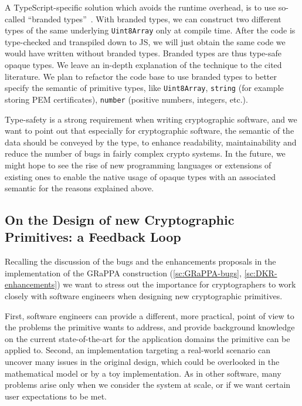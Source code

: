 A TypeScript-specific solution which avoids the runtime overhead, is to use
so-called ``branded types''~\cite{vanderkam2019effective, goldberg2022learning}. 
With branded types, we can construct two 
different types of the same underlying \texttt{Uint8Array} only
at compile time. After the code is type-checked and transpiled down to JS,
we will just obtain the same code we would have written without branded types.
Branded types are thus type-safe opaque types. We leave an in-depth explanation
of the technique to the cited literature. We plan to refactor the code base
to use branded types to better specify the semantic of primitive types,
like \texttt{Uint8Array}, \texttt{string} (for example storing PEM certificates),
\texttt{number} (positive numbers, integers, etc.).

Type-safety is a strong requirement when writing
cryptographic software, and we want to point out that especially for cryptographic
software, the semantic of the data should be conveyed by the type,
to enhance readability, maintainability and reduce the number of
bugs in fairly complex crypto systems.
In the future, we
might hope to see the rise of new programming languages
or extensions of existing ones to enable the native usage
of opaque types with an associated semantic for the reasons 
explained above.



\subsection{On the Design of new Cryptographic Primitives: a Feedback Loop}\label{sc:collaboration-crypto-se}

Recalling the discussion of the bugs and the enhancements 
proposals in the implementation of the GRaPPA construction
(\cref{sc:GRaPPA-bugs}, \cref{sc:DKR-enhancements})
we want to stress out the importance for
cryptographers to work closely with software engineers
when designing new cryptographic primitives.

First, software engineers can provide a different, more
practical, point of view to the problems the primitive
wants to address, and provide background knowledge
on the current state-of-the-art for the application
domains the primitive can be applied to.
Second, an implementation targeting a real-world scenario
can uncover many issues in the original design, which could be
overlooked in the mathematical model or by a toy implementation.
As in other software, many problems arise only when
we consider the system at scale, or if we want certain
user expectations to be met.

